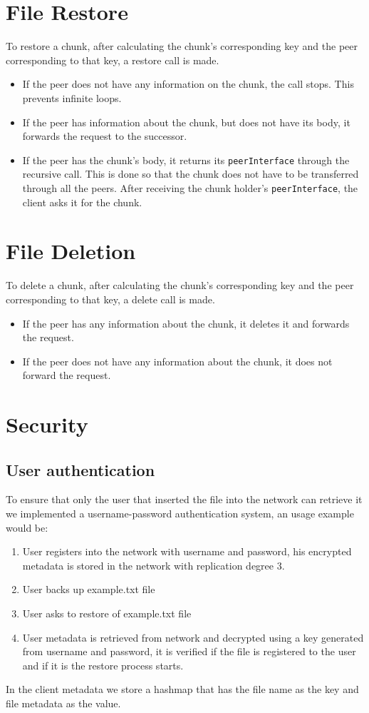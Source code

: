 \documentclass[11pt]{article}
\begin{document}
\section{File Restore}
To restore a chunk, after calculating the chunk's corresponding key and the peer corresponding to that key, a restore call is made. 

\begin{itemize}
\item If the peer does not have any information on the chunk, the call stops. This prevents infinite loops.
\item If the peer has information about the chunk, but does not have its body, it forwards the request to the successor.
\item If the peer has the chunk's body, it returns its \verb|peerInterface| through the recursive call. This is done so that the chunk does not have to be transferred through all the peers. After receiving the chunk holder's \verb|peerInterface|, the client asks it for the chunk.
\end{itemize}

\section{File Deletion}
To delete a chunk, after calculating the chunk's corresponding key and the peer corresponding to that key, a delete call is made. 

\begin{itemize}
\item If the peer has any information about the chunk, it deletes it and forwards the request.
\item If the peer does not have any information about the chunk, it does not forward the request.
\end{itemize}

\section{Security}

\subsection{User authentication}
To ensure that only the user that inserted the file into the network can retrieve it we implemented a username-password authentication system, an usage example would be:
\begin{enumerate}
\item User registers into the network with username and password, his encrypted metadata is stored in the network with replication degree 3.
\item User backs up example.txt file
\item User asks to restore of example.txt file
\item User metadata is retrieved from network and decrypted using a key generated from username and password, it is verified if the file is registered to the user and if it is the restore process starts.
\end{enumerate}
In the client metadata we store a hashmap that has the file name as the key and file metadata as the value. 
\end{document}

